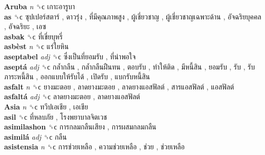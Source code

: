 \textbf{Aruba} \emph{n}  ␝ϲ   เกาะอารูบา   \\
\textbf{as} ␝ϲ   ซุปเปอร์สตาร์ ,  ดาวรุ่ง ,  ที่มีคุณภาพสูง ,  ผู้เชี่ยวชาญ ,  ผู้เชี่ยวชาญเฉพาะด้าน ,  อัจฉริยบุคคล ,  อัจฉริยะ ,  เอซ   \\
\textbf{asbak} ␝ϲ   ที่เขี่ยบุหรี่   \\
\textbf{asbèst} \emph{n}  ␝ϲ   แร่ใยหิน   \\
\textbf{aseptabel} \emph{adj}  ␝ϲ   ซึ่งเป็นที่ยอมรับ ,  ที่น่าพอใจ   \\
\textbf{aseptá} \emph{adj}  ␝ϲ   กล้ำกลืน ,  กล้ำกลืนฝืนทน ,  ตอบรับ ,  ทำให้ติด ,  มีหนี้สิน ,  ยอมรับ ,  รับ ,  รับภาระหนี้สิน ,  ออกแบบให้รับได้ ,  เปิดรับ ,  แบกรับหนี้สิน   \\
\textbf{asfalt} \emph{n}  ␝ϲ   ยางมะตอย ,  ลาดยางมะตอย ,  ลาดยางแอสฟัลต์ ,  สารแอสฟัลต์ ,  แอสฟัลต์   \\
\textbf{asfaltá} \emph{adj}  ␝ϲ   ลาดยางมะตอย ,  ลาดยางแอสฟัลต์   \\
\textbf{Asia} \emph{n}  ␝ϲ   ทวีปเอเชีย ,  เอเชีย   \\
\textbf{asil} ␝ϲ   ที่หลบภัย ,  โรงพยาบาลจิตเวช   \\
\textbf{asimilashon} ␝ϲ   การกลมกลืนเสียง ,  การผสมกลมกลืน   \\
\textbf{asimilá} \emph{adj}  ␝ϲ   กลืน   \\
\textbf{asistensia} \emph{n}  ␝ϲ   การช่วยเหลือ ,  ความช่วยเหลือ ,  ช่วย ,  ช่วยเหลือ   \\
